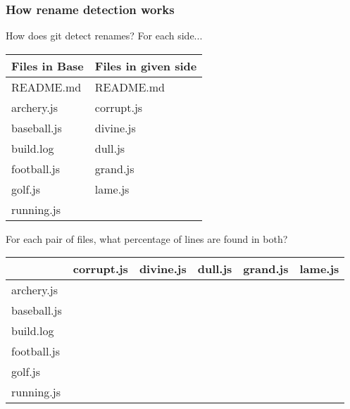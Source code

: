 \documentclass[compress,t]{beamer}
\begin{document}
\begin{frame}
  \frametitle{How rename detection works}

  How does git detect renames?  For each side...\\[0.25em]
  \pause
  \vspace*{-1.0\baselineskip}
  \begin{center}
    {\footnotesize
    \begin{tabular}{l|l}
      Files in Base  &  Files in given side \\
      \hline
      README.md      &  README.md   \\
      archery.js     &  corrupt.js  \\
      baseball.js    &  divine.js   \\
      build.log      &  dull.js     \\
      football.js    &  grand.js    \\
      golf.js        &  lame.js     \\
      running.js     &
    \end{tabular}
    }
  \end{center}
  \vspace*{-1.5\baselineskip}

  \pause
  \vspace*{\baselineskip}
  For each pair of files, what percentage of lines are found in both?
  \pause
  \vspace*{-0.25\baselineskip}
  \begin{center}
    {\footnotesize
    \begin{tabular}{l|l|l|l|l|l}
                   & corrupt.js & divine.js & dull.js & grand.js & lame.js \\
      \hline
      archery.js   &&&&& \\
      baseball.js  &&&&& \\
      build.log    &&&&& \\
      football.js  &&&&& \\
      golf.js      &&&&& \\
      running.js   &&&&&
    \end{tabular}
    }
  \end{center}

\end{frame}

\end{document}
